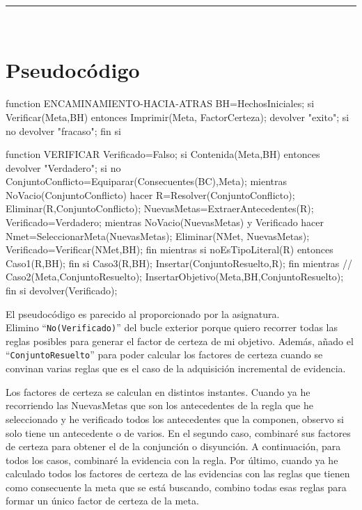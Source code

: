 
\begin{center}
	{\fboxrule=4pt } \\
	\setcounter{chapter}{2}
	\setcounter{section}{0}
	\rule{15cm}{0pt} \\
\end{center}

\section{Pseudocódigo}
\begin{listing}[language=Pascal]
function ENCAMINAMIENTO-HACIA-ATRAS
  BH=HechosIniciales;
  si Verificar(Meta,BH) entonces 
	Imprimir(Meta, FactorCerteza);
 	devolver "exito";
  si no
    devolver "fracaso";
  fin si
\end{listing}
\begin{listing}[language=Pascal]
function VERIFICAR
  Verificado=Falso;
  si Contenida(Meta,BH) entonces devolver "Verdadero";
  si no
    ConjuntoConflicto=Equiparar(Consecuentes(BC),Meta);
    mientras NoVacio(ConjuntoConflicto) hacer
      R=Resolver(ConjuntoConflicto);
	  Eliminar(R,ConjuntoConflicto);
	  NuevasMetas=ExtraerAntecedentes(R);
	  Verificado=Verdadero;
	  mientras NoVacio(NuevasMetas) y Verificado hacer
	  	Nmet=SeleccionarMeta(NuevasMetas);
		Eliminar(NMet, NuevasMetas);
		Verificado=Verificar(NMet,BH);
	  fin mientras
	  si noEsTipoLiteral(R) entonces Caso1(R,BH);
	  fin si
	  Caso3(R,BH);
	  Insertar(ConjuntoResuelto,R); 
	fin mientras
	// Caso2(Meta,ConjuntoResuelto);
	InsertarObjetivo(Meta,BH,ConjuntoResuelto); 
  fin si
  devolver(Verificado);
\end{listing}
\newpage
\par El pseudocódigo es parecido al proporcionado por la asignatura. \\
Elimino ``\texttt{No(Verificado)}'' del bucle exterior porque quiero recorrer todas
las reglas posibles para generar el factor de certeza de mi objetivo. Además,
añado el ``\texttt{ConjuntoResuelto}'' para poder calcular los factores de certeza 
cuando se convinan varias reglas que es el caso de la adquisición incremental de evidencia.
\par Los factores de certeza se calculan en distintos instantes. 
Cuando ya he recorriendo las NuevasMetas que son los antecedentes de la regla que he seleccionado 
y he verificado todos los antecedentes que la componen, observo si solo tiene un antecedente o
de varios. En el segundo caso, combinaré sus factores de certeza para obtener el de la conjunción o disyunción. 
A continuación, para todos los casos, combinaré la evidencia con la regla.
Por último, cuando ya he calculado todos los factores de certeza de las evidencias con las reglas que tienen como consecuente la meta
que se está buscando, combino todas esas reglas para formar un único factor de certeza de la meta. \\






